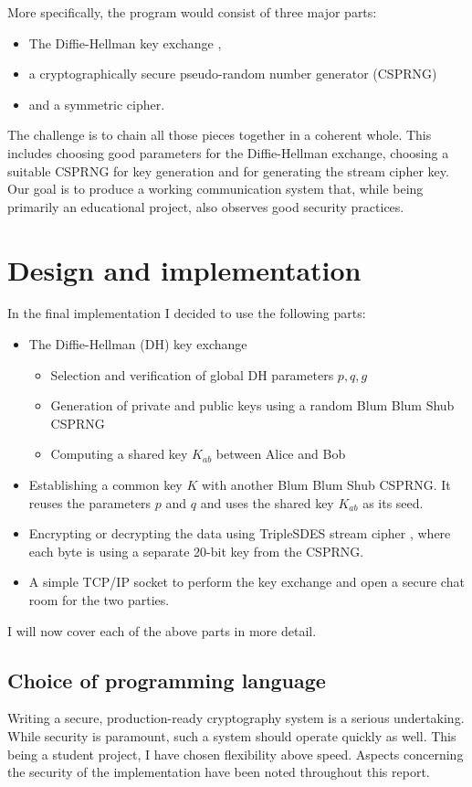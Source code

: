 \documentclass[a4paper,english,12pt]{article}
\begin{document}
More specifically, the program would consist of three major parts:
\begin{itemize}
  \item The Diffie-Hellman key exchange \cite{dh},
  \item a cryptographically secure pseudo-random number generator (CSPRNG)
  \item and a symmetric cipher.
\end{itemize}

The challenge is to chain all those pieces together in a coherent whole.  This
includes choosing good parameters for the Diffie-Hellman exchange, choosing a
suitable CSPRNG for key generation and for generating the stream cipher key.
Our goal is to produce a working communication system that, while being
primarily an educational project, also observes good security practices.

\section{Design and implementation}
In the final implementation I decided to use the following parts:
\begin{itemize}
  \item The Diffie-Hellman \cite{dh} (DH) key exchange
    \begin{itemize}
      \item Selection and verification of global DH parameters $p, q, g$
      \item Generation of private and public keys using a random Blum Blum Shub CSPRNG
      \item Computing a shared key $K_{ab}$ between Alice and Bob
    \end{itemize}
  \item Establishing a common key $K$ with another Blum Blum Shub CSPRNG. It
    reuses the parameters $p$ and $q$ and uses the shared key $K_{ab}$ as its
    seed.
  \item Encrypting or decrypting the data using TripleSDES stream cipher
    \cite{sdes}, where each byte is using a separate 20-bit key from the
    CSPRNG.
  \item A simple TCP/IP socket to perform the key exchange and open a secure
    chat room for the two parties.
\end{itemize}
I will now cover each of the above parts in more detail.

\subsection{Choice of programming language}
Writing a secure, production-ready cryptography system is a serious
undertaking. While security is paramount, such a system should operate quickly
as well. This being a student project, I have chosen flexibility above
speed. Aspects concerning the security of the implementation have been noted
throughout this report.
\end{document}
